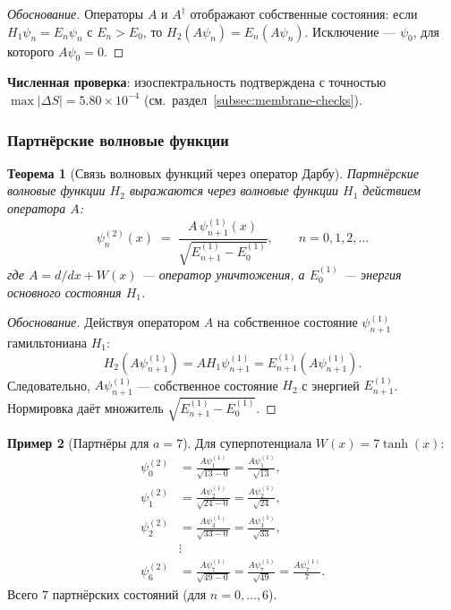 \documentclass[11pt,a4paper]{article}
\newtheorem{theorem}{Теорема}[section]
\theoremstyle{definition}
\newtheorem{example}[theorem]{Пример}
\begin{document}
\begin{proof}[Обоснование]
Операторы $A$ и $A^\dagger$ отображают собственные состояния:
если $H_1 \psi_n = E_n \psi_n$ с $E_n > E_0$, то
$H_2 (A \psi_n) = E_n (A \psi_n)$. Исключение --- $\psi_0$,
для которого $A \psi_0 = 0$.
\end{proof}

\medskip\noindent
\textbf{Численная проверка}: изоспектральность подтверждена
с точностью $\max|\Delta S| = 5.80 \times 10^{-4}$ (см.~раздел~\ref{subsec:membrane-checks}).

\subsubsection{Партнёрские волновые функции}
\label{subsubsec:membrane-partner-wf}

\begin{theorem}[Связь волновых функций через оператор Дарбу]
\label{thm:partner-wave-functions}
Партнёрские волновые функции $H_2$ выражаются через 
волновые функции $H_1$ действием оператора $A$:
\begin{equation}
    \boxed{
    \psi_n^{(2)}(x) \;=\; \frac{A \, \psi_{n+1}^{(1)}(x)}
    {\sqrt{E_{n+1}^{(1)} - E_0^{(1)}}},
    \qquad n = 0, 1, 2, \ldots
    }
    \label{eq:partner-wave-functions}
\end{equation}
где $A = d/dx + W(x)$ --- оператор уничтожения, а 
$E_0^{(1)}$ --- энергия основного состояния $H_1$.
\end{theorem}

\begin{proof}[Обоснование]
Действуя оператором $A$ на собственное состояние $\psi_{n+1}^{(1)}$ 
гамильтониана $H_1$:
\begin{equation}
    H_2 \left( A \psi_{n+1}^{(1)} \right)
    = A H_1 \psi_{n+1}^{(1)}
    = E_{n+1}^{(1)} \left( A \psi_{n+1}^{(1)} \right).
\end{equation}
Следовательно, $A \psi_{n+1}^{(1)}$ --- собственное состояние 
$H_2$ с энергией $E_{n+1}^{(1)}$. Нормировка даёт множитель 
$\sqrt{E_{n+1}^{(1)} - E_0^{(1)}}$.
\end{proof}

\begin{example}[Партнёры для $a = 7$]
Для суперпотенциала $W(x) = 7 \tanh(x)$:
\begin{align}
    \psi_0^{(2)} &= \frac{A \psi_1^{(1)}}{\sqrt{13 - 0}} 
                   = \frac{A \psi_1^{(1)}}{\sqrt{13}}, \\
    \psi_1^{(2)} &= \frac{A \psi_2^{(1)}}{\sqrt{24 - 0}} 
                   = \frac{A \psi_2^{(1)}}{\sqrt{24}}, \\
    \psi_2^{(2)} &= \frac{A \psi_3^{(1)}}{\sqrt{33 - 0}} 
                   = \frac{A \psi_3^{(1)}}{\sqrt{33}}, \\
    &\vdots \\
    \psi_6^{(2)} &= \frac{A \psi_7^{(1)}}{\sqrt{49 - 0}} 
                   = \frac{A \psi_7^{(1)}}{\sqrt{49}} = 
                   \frac{A \psi_7^{(1)}}{7}.
\end{align}
Всего $7$ партнёрских состояний (для $n = 0, \ldots, 6$).
\end{example}
\end{document}
